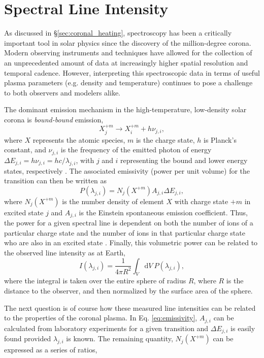 \section{Spectral Line Intensity}
\label{sec:spectral_lines}
%
As discussed in \S\ref{sec:coronal_heating}, spectroscopy has been a critically important tool in solar physics since the discovery of the million-degree corona. Modern observing instruments and techniques have allowed for the collection of an unprecedented amount of data at increasingly higher spatial resolution and temporal cadence. However, interpreting this spectroscopic data in terms of useful plasma parameters (e.g. density and temperature) continues to pose a challenge to both observers and modelers alike.
%
\par The dominant emission mechanism in the high-temperature, low-density solar corona is \textit{bound-bound} emission,
\begin{equation}
	\label{eq:bound_bound}
	X_j^{+m}\to X_i^{+m} + h\nu_{j,i},
\end{equation}
where $X$ represents the atomic species, $m$ is the charge state, $h$ is Planck's constant, and $\nu_{j,i}$ is the frequency of the emitted photon of energy $\Delta E_{j,i} = h\nu_{j,i}=hc/\lambda_{j,i}$, with $j$ and $i$ representing the bound and lower energy states, respectively \citep{mason_spectroscopic_1994}. The associated emissivity (power per unit volume) for the transition can then be written as 
\begin{equation}
	\label{eq:emissivity}
	P(\lambda_{j,i})=N_j(X^{+m})A_{j,i}\Delta E_{j,i},
\end{equation}
where $N_j(X^{+m})$ is the number density of element $X$ with charge state $+m$ in excited state $j$ and $A_{j,i}$ is the Einstein spontaneous emission coefficient. Thus, the power for a given spectral line is dependent on both the number of ions of a particular charge state and the number of ions in that particular charge state who are also in an excited state \citep{mason_spectroscopic_1994,bradshaw_collisional_2013}. Finally, this volumetric power can be related to the observed line intensity as at Earth,
\begin{equation}
	\label{eq:intensity}
	I(\lambda_{j,i}) = \frac{1}{4\pi R^2}\int_V \mathrm{d}V~P(\lambda_{j,i}),
\end{equation}
where the integral is taken over the entire sphere of radius $R$, where $R$ is the distance to the observer, and then normalized by the surface area of the sphere.
%
\par The next question is of course how these measured line intensities can be related to the properties of the coronal plasma. In Eq. \ref{eq:emissivity}, $A_{j,i}$ can be calculated from laboratory experiments for a given transition and $\Delta E_{j,i}$ is easily found provided $\lambda_{j,i}$ is known. The remaining quantity, $N_j(X^{+m})$ can be expressed as a series of ratios,
